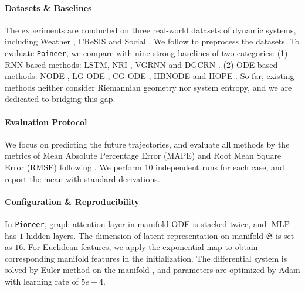 


\paragraph{Datasets \& Baselines}
The experiments are conducted on  three real-world  datasets of dynamic systems, 
including Weather \citep{aistats22NikitinWeather}, CReSIS \citep{MMTIMRF13CgogineniCReSIS} and Social \citep{kdd17SGsocial}.
We follow \citet{kdd21CoupledGraphODE} to preprocess the datasets.
To evaluate \texttt{Poineer}, we compare with nine strong baselines of two categories:
(1) RNN-based methods: LSTM, NRI \citep{icml18Kipf}, VGRNN \citep{nips19HVGRNN} and DGCRN \citep{tkdd23DGCRN}.
(2) ODE-based methods: NODE \citep{nips18NODE}, LG-ODE \citep{nips20Huang}, CG-ODE \citep{kdd21CoupledGraphODE}, HBNODE \citep{nips21HBNODE} and HOPE \citep{icml23HOPE}.
So far, existing methods neither consider Riemannian geometry nor system entropy, and we are dedicated to bridging this gap. 



\paragraph{Evaluation Protocol}
We focus on predicting the future trajectories, and evaluate all methods by the metrics of Mean Absolute Percentage Error (MAPE) and Root Mean Square Error (RMSE) following \citep{kdd21CoupledGraphODE,icml23HOPE}.
We perform 10 independent runs for each case, and report the mean with standard derivations. 



\paragraph{Configuration \& Reproducibility}
In \texttt{Pioneer}, graph attention layer in manifold ODE is stacked twice, and $\operatorname{MLP}$ has $1$ hidden layers.
The dimension of latent representation on manifold $\mathfrak{S}$ is set as $16$.
For Euclidean features, we apply the exponential map to obtain corresponding manifold features in the initialization.
The differential system is solved by Euler method on the manifold \cite{riemanEular02}, and parameters are optimized by Adam  with learning rate of $5e-4$.



